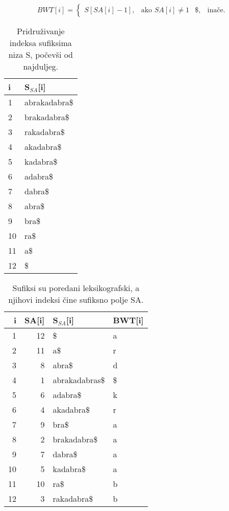 \documentclass[11pt]{article}
\begin{document}
\[
BWT[i]=\begin{cases}
S[SA[i]-1], & \text{ako } SA[i]\neq 1 &
\$, & \text{inače}.
\end{cases}
\]
 
 
\begin{table}
	\caption{Pridruživanje indeksa sufiksima niza S, počevši od najduljeg.}
	\label{tablePrimjer1}
	\begin{center}
		\begin{tabular}{ll}
			\toprule
			i & S$_{SA}$[i] \\
			\midrule
			1 & abrakadabra\$ \\
			2 & brakadabra\$ \\
			3 & rakadabra\$ \\
			4 & akadabra\$ \\
			5 & kadabra\$ \\
			6 & adabra\$ \\
			7 & dabra\$ \\
			8 & abra\$ \\
			9 & bra\$ \\
			10 & ra\$ \\
			11 & a\$ \\
			12 & \$ \\
			\bottomrule
		\end{tabular}
	\end{center}
\end{table}

\begin{table}
	\caption{Sufiksi su poredani leksikografski, a njihovi indeksi čine sufiksno polje SA.}
	\label{tablePrimjer2}
	\begin{center}
		\begin{tabular}{rrll}
			\toprule
			i & SA[i] & S$_{SA}$[i] & BWT[i] \\
			\midrule
			1 & 12 & \$ & a\\
			2 & 11 &  a\$ & r \\
			3 & 8 & abra\$ & d \\
			4 & 1 & abrakadabras\$ & \$ \\
			5 & 6 & adabra\$ & k \\
			6 & 4 & akadabra\$ & r \\
			7 & 9 & bra\$ & a\\
			8 & 2 & brakadabra\$ & a\\
			9 & 7 & dabra\$ & a \\
			10 & 5 & kadabra\$ & a\\
			11 & 10 & ra\$ & b \\
			12 & 3 & rakadabra\$ & b\\
			\bottomrule
		\end{tabular}
		
	\end{center}
	
\end{table}
\end{document}
